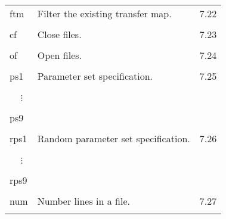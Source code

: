 \begin{center}
\begin{tabular}{lll}
\hspace{1.5em}ftm   &        Filter the existing transfer map.     & \hspace{2em}7.22\\
\vspace{-3mm}& &\\
\hspace{1.5em}cf    &        Close files.                          & \hspace{2em}7.23\\
\vspace{-3mm}& &\\
\hspace{1.5em}of   &         Open files.                          & \hspace{2em}7.24\\
\vspace{-3mm}& &\\
\hspace{1.5em}ps1   &        Parameter set specification.          & \hspace{2em}7.25\\
\vspace{-7mm}& &\\
\hspace{1.5em}\ \ \,$\vdots$ & &\\
\vspace{-7mm}& &\\
\hspace{1.5em}ps9   & &\\
\vspace{-3mm}& &\\
\hspace{1.5em}rps1  &         Random parameter set specification.  & \hspace{2em}7.26\\
\vspace{-7mm}& &\\
\hspace{1.5em}\ \ \,$\vdots$ & &\\
\vspace{-7mm}& &\\
\hspace{1.5em}rps9  & &\\
\vspace{-3mm}& &\\
\hspace{1.5em}num   &        Number lines in a file.               & \hspace{2em}7.27\\
\vspace{-3mm}& &\\

\end{tabular}
\end{center}
